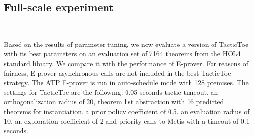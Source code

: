 \documentclass[runningheads,a4paper,draft]{svjour3}
\def\holfour{\textsf{HOL4}\xspace}
\def\eprover{\textsf{E-prover}\xspace}
\def\metis{\textsf{Metis}\xspace}
\def\tactictoe{\textsf{TacticToe}\xspace}
\begin{document}
%
%
%


\subsection{Full-scale experiment}~\label{sec:full_exp}

Based on the results of parameter tuning, we now evaluate a version of 
\tactictoe with its best parameters on an evaluation set of 7164 theorems from 
the \holfour standard library. We compare it with the performance of \eprover.
For reasons of fairness, \eprover asynchronous calls are not included in the 
best \tactictoe strategy. The ATP \eprover is run in auto-schedule mode with 
128 premises. The settings for \tactictoe are the following:
0.05 seconds tactic timeout, an orthogonalization radius of 20, theorem list 
abstraction with 16 predicted theorems for instantiation, a prior policy 
coefficient of 0.5, an evaluation radius of 10, an exploration coefficient of 2 
and priority calls to \metis with a timeout of 0.1 seconds.
\end{document}
